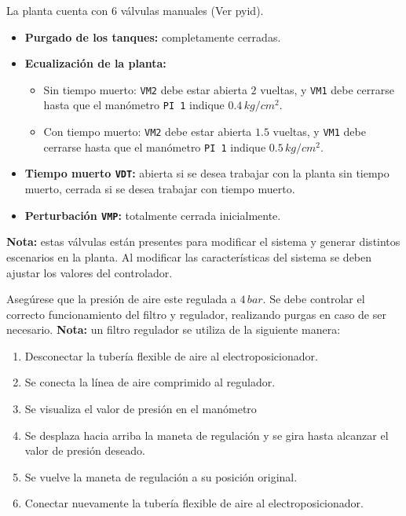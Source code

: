 \begin{tcolorbox}[title=Válvulas manuales, breakable]

La planta cuenta con 6 válvulas manuales (Ver \gls{pyid}).

 \begin{itemize}
  \item \textbf{Purgado de los tanques:} completamente cerradas.
  \item \textbf{Ecualización de la planta:}
  \begin{itemize}
   \item Sin tiempo muerto: \verb|VM2| debe estar abierta $2$ vueltas, y
   \verb|VM1| debe cerrarse hasta que el manómetro \verb|PI 1| indique
   $0.4\,kg/cm^2$.
   \item Con tiempo muerto: \verb|VM2| debe estar abierta $1.5$ vueltas, y
   \verb|VM1| debe cerrarse hasta que el manómetro \verb|PI 1| indique
   $0.5\,kg/cm^2$.
  \end{itemize}
  \item \textbf{Tiempo muerto \texttt{VDT}:} abierta si se desea trabajar con
la planta sin tiempo muerto, cerrada si se desea trabajar con tiempo muerto.
  \item \textbf{Perturbación \texttt{VMP}:} totalmente cerrada inicialmente.
 \end{itemize}
 \tcblower
 \textbf{Nota:} estas válvulas están presentes para modificar el sistema y
generar distintos
escenarios en la planta. Al modificar las características del sistema se deben
ajustar los valores del controlador.
\end {tcolorbox}

\begin{tcolorbox}[title=Presión de aire en la válvula]
  Asegúrese que la presión de aire este regulada a $4\,bar$. Se debe controlar
  el correcto funcionamiento del filtro y regulador, realizando purgas en caso
de ser necesario.
 \tcblower
  \textbf{Nota:} un filtro regulador se utiliza de la siguiente manera:
 \begin{enumerate}
    \item Desconectar la tubería flexible de aire al electroposicionador.
    \item Se conecta la línea de aire comprimido al regulador.
    \item Se visualiza el valor de presión en el manómetro
    \item Se desplaza hacia arriba la maneta de regulación y se gira hasta
      alcanzar el valor de presión deseado.
    \item Se vuelve la maneta de regulación a su posición original.
    \item Conectar nuevamente la tubería flexible de aire al
electroposicionador.
 \end{enumerate}
\end {tcolorbox}

